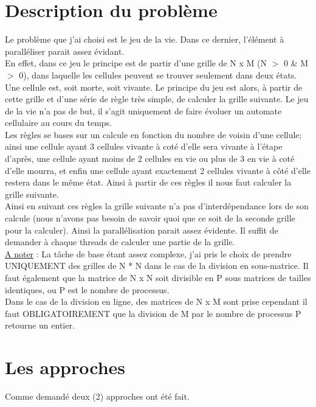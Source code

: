 \documentclass[10pt,a4paper]{article}
\begin{document}
\section{Description du problème}

\indent Le problème que j'ai choisi est le jeu de la vie. Dans ce dernier, l'élément à paralléliser parait assez évidant. \\
En effet, dans ce jeu le principe est de partir d'une grille de N x M (N $>$ 0 \& M $>$ 0), dans laquelle les cellules peuvent se trouver seulement dans deux états. Une cellule est, soit morte, soit vivante. 
Le principe du jeu est alors, à partir de cette grille et d'une série de règle très simple, de calculer la grille suivante. 
Le jeu de la vie n'a pas de but, il s'agit uniquement de faire évoluer un automate cellulaire au cours du temps.\\

Les règles se bases sur un calcule en fonction du nombre de voisin d'une cellule; ainsi une cellule ayant 3 cellules vivante à coté d'elle sera vivante à l'étape d'après, une cellule ayant moins de 2 cellules en vie ou plus de 3 en vie à coté d'elle mourra, et enfin une cellule ayant exactement 2 cellules vivante à côté d'elle restera dans le même état. Ainsi à partir de ces règles il nous faut calculer la grille suivante. \\

Ainsi en suivant ces règles la grille suivante n'a pas d'interdépendance lors de son calcule (nous n'avons pas besoin de savoir quoi que ce soit de la seconde grille pour la calculer). Ainsi la parallélisation parait assez évidente. Il suffit de demander à chaque threads de calculer une partie de la grille. \\

\underline{A noter} : La tâche de base étant assez complexe, j'ai pris le choix de prendre UNIQUEMENT des grilles de N * N dans le cas de la division en sous-matrice. Il faut également que la matrice de N x N soit divisible en P sous matrices de tailles identiques, ou P est le nombre de processus.\\
Dans le cas de la division en ligne, des matrices de N x M sont prise cependant il faut OBLIGATOIREMENT que la division de M par le nombre de processus P retourne un entier. \\
\section{Les approches}
Comme demandé deux (2) approches ont été fait. \\
\end{document}
